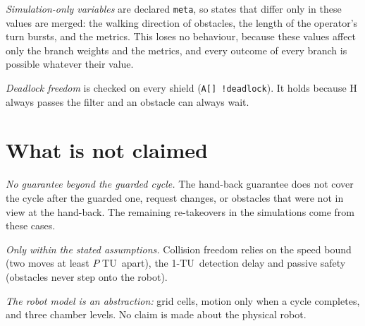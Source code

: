 \documentclass[11pt,a4paper]{article}
\theoremstyle{definition}
\newcommand{\tu}{TU}
\begin{document}
\emph{Simulation-only variables} are declared \texttt{meta}, so states that differ only in these values are merged: the walking direction of obstacles, the length of the operator's turn bursts, and the metrics. This loses no behaviour, because these values affect only the branch weights and the metrics, and every outcome of every branch is possible whatever their value.

\emph{Deadlock freedom} is checked on every shield (\texttt{A[] !deadlock}). It holds because H always passes the filter and an obstacle can always wait.

\section{What is not claimed}

\emph{No guarantee beyond the guarded cycle.} The hand-back guarantee does not cover the cycle after the guarded one, request changes, or obstacles that were not in view at the hand-back. The remaining re-takeovers in the simulations come from these cases.

\emph{Only within the stated assumptions.} Collision freedom relies on the speed bound (two moves at least $P$ \tu\ apart), the 1-\tu\ detection delay and passive safety (obstacles never step onto the robot).

\emph{The robot model is an abstraction:} grid cells, motion only when a cycle completes, and three chamber levels. No claim is made about the physical robot.
\end{document}
